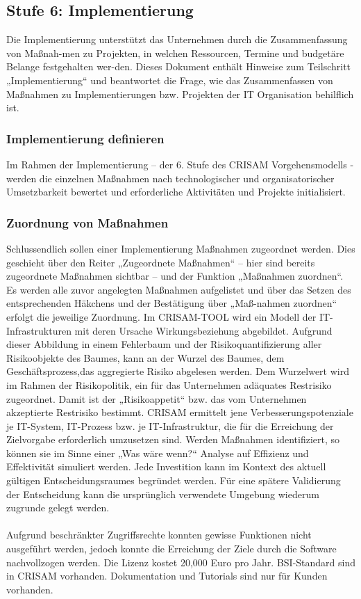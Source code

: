 \subsection{Stufe 6: Implementierung}
Die Implementierung unterstützt das Unternehmen durch die Zusammenfassung von Maßnah-men zu Projekten, in welchen Ressourcen, Termine und budgetäre Belange festgehalten wer-den.
Dieses Dokument enthält Hinweise zum Teilschritt „Implementierung“ und beantwortet die Frage, wie das Zusammenfassen von Maßnahmen zu Implementierungen bzw. Projekten der IT Organisation behilflich ist.
\subsubsection{Implementierung definieren}
Im Rahmen der Implementierung – der 6. Stufe des CRISAM Vorgehensmodells - werden die einzelnen Maßnahmen nach technologischer und organisatorischer Umsetzbarkeit bewertet und erforderliche Aktivitäten und Projekte initialisiert.
\subsubsection{Zuordnung von Maßnahmen}
Schlussendlich sollen einer Implementierung Maßnahmen zugeordnet werden. Dies geschieht über den Reiter „Zugeordnete Maßnahmen“ – hier sind bereits zugeordnete Maßnahmen sichtbar – und der Funktion „Maßnahmen zuordnen“. Es werden alle zuvor angelegten Maßnahmen aufgelistet und über das Setzen des entsprechenden Häkchens und der Bestätigung über „Maß-nahmen zuordnen“ erfolgt die jeweilige Zuordnung.
Im CRISAM-TOOL wird ein Modell der IT-Infrastrukturen mit deren Ursache Wirkungsbeziehung abgebildet. Aufgrund dieser Abbildung in einem Fehlerbaum und der Risikoquantifizierung aller Risikoobjekte des Baumes, kann an der Wurzel des Baumes, dem Geschäftsprozess,das aggregierte Risiko abgelesen werden. Dem Wurzelwert wird im Rahmen der Risikopolitik, ein für das Unternehmen adäquates Restrisiko zugeordnet. Damit ist der „Risikoappetit“ bzw. das vom Unternehmen akzeptierte Restrisiko bestimmt.
CRISAM ermittelt jene Verbesserungspotenziale je IT-System, IT-Prozess bzw. je IT-Infrastruktur,
die für die Erreichung der Zielvorgabe erforderlich umzusetzen sind.
Werden Maßnahmen identifiziert, so können sie im Sinne einer „Was wäre wenn?“ Analyse auf Effizienz und Effektivität simuliert werden. Jede Investition kann im Kontext des aktuell gültigen Entscheidungsraumes begründet werden. Für eine spätere Validierung der Entscheidung kann die ursprünglich verwendete Umgebung wiederum zugrunde gelegt werden.
\\
\\
Aufgrund beschränkter Zugriffsrechte konnten gewisse Funktionen nicht ausgeführt werden, jedoch konnte die Erreichung der Ziele durch die Software nachvollzogen werden.
Die Lizenz kostet 20,000 Euro pro Jahr. BSI-Standard sind in CRISAM vorhanden. Dokumentation und Tutorials sind nur für Kunden vorhanden. 
